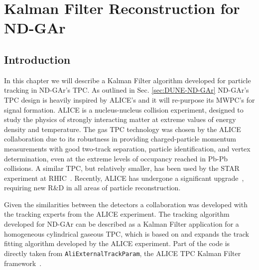 \begin{savequote}[8cm]
\end{savequote}

\chapter{\label{ch:5-KF-NDGArToy}Kalman Filter Reconstruction for ND-GAr}

\minitoc
\section{Introduction}

In this chapter we will describe a Kalman Filter algorithm developed for particle tracking in ND-GAr's TPC. As outlined in Sec. \ref{sec:DUNE-ND-GAr} ND-GAr's TPC design is heavily inspired by ALICE's and it will re-purpose its MWPC's for signal formation. ALICE is a nucleus-nucleus collision experiment, designed to study the physics of strongly interacting matter at extreme values of energy density and temperature. The gas TPC technology was chosen by the ALICE collaboration due to its robustness in providing charged-particle momentum measurements with good two-track separation, particle identification, and vertex determination, even at the extreme levels of occupancy reached in Pb-Pb collisions. A similar TPC, but relatively smaller, has been used by the STAR experiment at RHIC~\cite{STAR:2002eio}. Recently, ALICE has undergone a significant upgrade~\cite{ALICE:2023udb}, requiring new R\&D in all areas of particle reconstruction.

Given the similarities between the detectors a collaboration was developed with the tracking experts from the ALICE experiment. The tracking algorithm developed for ND-GAr can be described as a Kalman Filter application  for a homogeneous cylindrical gaseous TPC, which is based on and expands the track fitting algorithm developed by the ALICE experiment. Part of the code is directly taken from \texttt{AliExternalTrackParam}, the ALICE TPC Kalman Filter framework~\cite{aliroot, Belikov:1997ska, carminati2003simulation}. 

